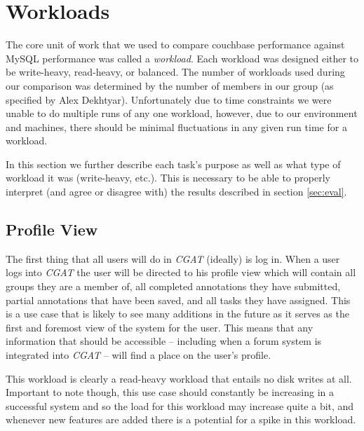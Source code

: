 \documentclass[]{IEEEtran}
\begin{document}
\clearpage

\section{Workloads}\label{sec:workload}
The core unit of work that we used to compare couchbase performance against
MySQL performance was called a \textit{workload}. Each workload was designed
either to be write-heavy, read-heavy, or balanced. The number of workloads used
during our comparison was determined by the number of members in our group (as
specified by Alex Dekhtyar). Unfortunately due to time constraints we were
unable to do multiple runs of any one workload, however, due to our environment
and machines, there should be minimal fluctuations in any given run time for a
workload.

In this section we further describe each task's purpose as well as what type of
workload it was (write-heavy, etc.). This is necessary to be able to properly
interpret (and agree or disagree with) the results described in section
\ref{sec:eval}.

\subsection{Profile View}
The first thing that all users will do in \textit{CGAT} (ideally) is log in.
When a user logs into \textit{CGAT} the user will be directed to his profile
view which will contain all groups they are a member of, all completed
annotations they have submitted, partial annotations that have been saved, and
all tasks they have assigned. This is a use case that is likely to see many
additions in the future as it serves as the first and foremost view of the
system for the user. This means that any information that should be accessible
-- including when a forum system is integrated into \textit{CGAT} -- will find
a place on the user's profile.

This workload is clearly a read-heavy workload that entails no disk writes at
all. Important to note though, this use case should constantly be increasing in a successful system and so the load for
this workload may increase quite a bit, and whenever new features are added
there is a potential for a spike in this workload.

\end{document}
